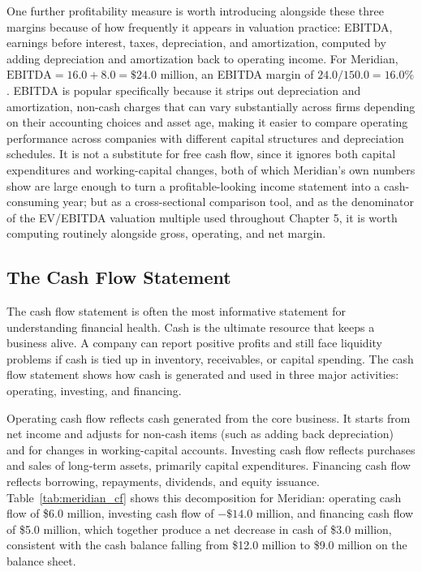 \documentclass[../ai_in_finance]{subfiles}
\begin{document}
One further profitability measure is worth introducing alongside these three margins because of how frequently it appears in valuation practice: EBITDA, earnings before interest, taxes, depreciation, and amortization, computed by adding depreciation and amortization back to operating income. For Meridian, $\text{EBITDA} = 16.0 + 8.0 = \$24.0$ million, an EBITDA margin of $24.0/150.0 = 16.0\%$. EBITDA is popular specifically because it strips out depreciation and amortization, non-cash charges that can vary substantially across firms depending on their accounting choices and asset age, making it easier to compare operating performance across companies with different capital structures and depreciation schedules.
It is not a substitute for free cash flow, since it ignores both capital expenditures and working-capital changes, both of which Meridian's own numbers show are large enough to turn a profitable-looking income statement into a cash-consuming year; but as a cross-sectional comparison tool, and as the denominator of the EV/EBITDA valuation multiple used throughout Chapter 5, it is worth computing routinely alongside gross, operating, and net margin.

\subsection{The Cash Flow Statement}
\label{sec:cash-flow-statement}

The cash flow statement is often the most informative statement for understanding financial health. Cash is the ultimate resource that keeps a business alive. A company can report positive profits and still face liquidity problems if cash is tied up in inventory, receivables, or capital spending. The cash flow statement shows how cash is generated and used in three major activities: operating, investing, and financing.

Operating cash flow reflects cash generated from the core business. It starts from net income and adjusts for non-cash items (such as adding back depreciation) and for changes in working-capital accounts. Investing cash flow reflects purchases and sales of long-term assets, primarily capital expenditures. Financing cash flow reflects borrowing, repayments, dividends, and equity issuance. Table~\ref{tab:meridian_cf} shows this decomposition for Meridian: operating cash flow of \$6.0 million, investing cash flow of $-\$14.0$ million, and financing cash flow of \$5.0 million, which together produce a net decrease in cash of \$3.0 million, consistent with the cash balance falling from \$12.0 million to \$9.0 million on the balance sheet.
\end{document}
